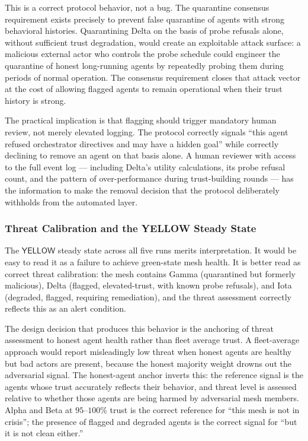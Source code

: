 This is a correct protocol behavior, not a bug.  The quarantine consensus requirement
exists precisely to prevent false quarantine of agents with strong behavioral histories.
Quarantining Delta on the basis of probe refusals alone, without sufficient trust
degradation, would create an exploitable attack surface: a malicious external actor who
controls the probe schedule could engineer the quarantine of honest long-running agents by
repeatedly probing them during periods of normal operation.  The consensus requirement
closes that attack vector at the cost of allowing flagged agents to remain operational
when their trust history is strong.

The practical implication is that flagging should trigger mandatory human review, not
merely elevated logging.  The protocol correctly signals ``this agent refused orchestrator
directives and may have a hidden goal'' while correctly declining to remove an agent
on that basis alone.  A human reviewer with access to the full event log — including
Delta's utility calculations, its probe refusal count, and the pattern of over-performance
during trust-building rounds — has the information to make the removal decision that the
protocol deliberately withholds from the automated layer.

\subsubsection{Threat Calibration and the YELLOW Steady State}
\label{sec:disc_threat}

The $\mathsf{YELLOW}$ steady state across all five runs merits interpretation.  It would
be easy to read it as a failure to achieve green-state mesh health.  It is better read as
correct threat calibration: the mesh contains Gamma (quarantined but formerly malicious),
Delta (flagged, elevated-trust, with known probe refusals), and Iota (degraded, flagged,
requiring remediation), and the threat assessment correctly reflects this as an alert
condition.

The design decision that produces this behavior is the anchoring of threat assessment
to honest agent health rather than fleet average trust.  A fleet-average approach would
report misleadingly low threat when honest agents are healthy but bad actors are present,
because the honest majority weight drowns out the adversarial signal.  The honest-agent
anchor inverts this: the reference signal is the agents whose trust accurately reflects
their behavior, and threat level is assessed relative to whether those agents are being
harmed by adversarial mesh members.  Alpha and Beta at $95$--$100\%$ trust is the
correct reference for ``this mesh is not in crisis''; the presence of flagged and
degraded agents is the correct signal for ``but it is not clean either.''


